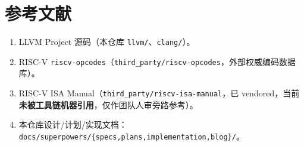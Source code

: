 \documentclass[11pt,UTF8,fontset=none]{ctexart}
\begin{document}
\section*{参考文献}
\begin{enumerate}[leftmargin=1.6em,itemsep=1pt]
\item LLVM Project 源码（本仓库 \texttt{llvm/}、\texttt{clang/}）。
\item RISC-V \texttt{riscv-opcodes}（\texttt{third\_party/riscv-opcodes}，外部权威编码数据库）。
\item RISC-V ISA Manual（\texttt{third\_party/riscv-isa-manual}，已 vendored，当前\textbf{未被工具链机器引用}，仅作团队人审旁路参考）。
\item 本仓库设计/计划/实现文档：\texttt{docs/superpowers/\{specs,plans,implementation,blog\}/}。
\end{enumerate}
\end{document}
